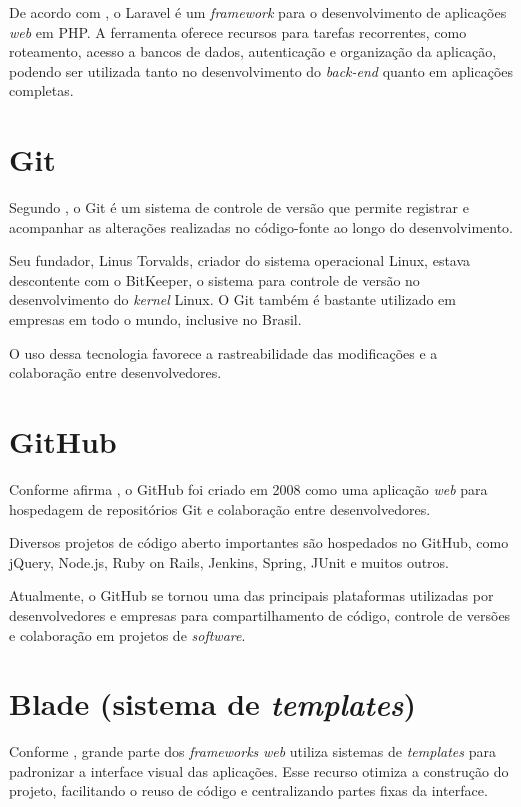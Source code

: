 De acordo com , o Laravel é um \textit{framework} para o desenvolvimento de aplicações \textit{web} em PHP. A ferramenta oferece recursos para tarefas recorrentes, como roteamento, acesso a bancos de dados, autenticação e organização da aplicação, podendo ser utilizada tanto no desenvolvimento do \textit{back-end} quanto em aplicações completas.

\section{Git}
Segundo , o Git é um sistema de controle de versão que permite registrar e acompanhar as alterações realizadas no código-fonte ao longo do desenvolvimento.

Seu fundador, Linus Torvalds, criador do sistema operacional Linux, estava descontente com o BitKeeper, o sistema para controle de versão no desenvolvimento do \textit{kernel} Linux. O Git também é bastante utilizado em empresas em todo o mundo, inclusive no Brasil.

O uso dessa tecnologia favorece a rastreabilidade das modificações e a colaboração entre desenvolvedores.

\section{GitHub}
Conforme afirma , o GitHub foi criado em 2008 como uma aplicação \textit{web} para hospedagem de repositórios Git e colaboração entre desenvolvedores.

Diversos projetos de código aberto importantes são hospedados no GitHub, como jQuery, Node.js, Ruby on Rails, Jenkins, Spring, JUnit e muitos outros.

Atualmente, o GitHub se tornou uma das principais plataformas utilizadas por desenvolvedores e empresas para compartilhamento de código, controle de versões e colaboração em projetos de \textit{software}.

\section{Blade (sistema de \textit{templates})}

Conforme , grande parte dos \textit{frameworks} \textit{web} utiliza sistemas de \textit{templates} para padronizar a interface visual das aplicações. Esse recurso otimiza a construção do projeto, facilitando o reuso de código e centralizando partes fixas da interface.

